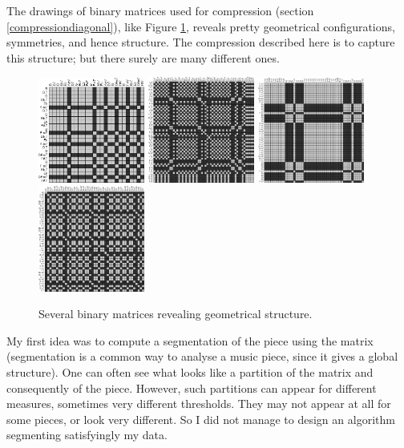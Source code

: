 \documentclass[a4paper,10pt]{article}
\begin{document}
The drawings of binary matrices used for compression (section \ref{compressiondiagonal}), like Figure \ref{pretty}, reveals pretty geometrical configurations, symmetries, and hence structure. The compression described here is to capture this structure; but there surely are many different ones.

\begin{figure}[h]
\centering
\includegraphics[width=3.5cm]{images/pretty1.jpg}\hspace{0.5cm}
\includegraphics[width=3.5cm]{images/pretty2.jpg}\hspace{0.5cm}
\includegraphics[width=3.5cm]{images/pretty3.jpg}\hspace{0.5cm}
\includegraphics[width=3.5cm]{images/pretty4.jpg}
\caption{Several binary matrices revealing geometrical structure.\label{pretty}}
\end{figure}

My first idea was to compute a segmentation of the piece using the matrix (segmentation is a common way to analyse a music piece, since it gives a global structure). One can often see what looks like a partition of the matrix and consequently of the piece. However, such partitions can appear for different measures, sometimes very different thresholds. They may not appear at all for some pieces, or look very different. So I did not manage to design an algorithm segmenting satisfyingly my data.
\end{document}
